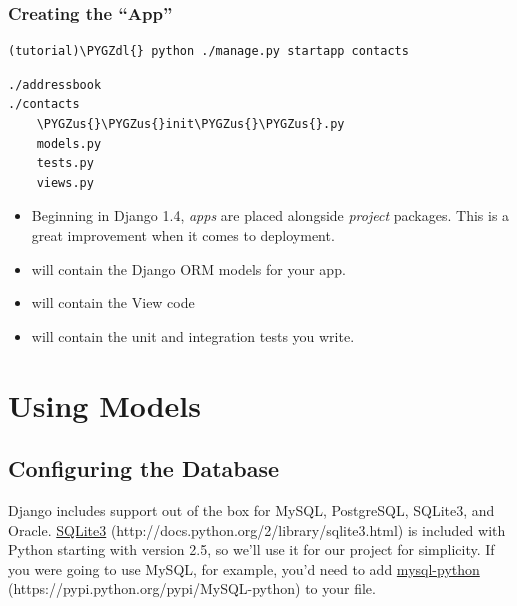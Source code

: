 \documentclass[letterpaper,10pt,english]{sphinxmanual}
\def\PYGZus{\char`\_}
\def\PYGZdl{\char`\$}
\begin{document}
\subsection{Creating the ``App''}
\label{tutorial/getting-started:creating-the-app}\label{tutorial/getting-started:wsgi}
\begin{Verbatim}[commandchars=\\\{\}]
(tutorial)\PYGZdl{} python ./manage.py startapp contacts
\end{Verbatim}

\begin{Verbatim}[commandchars=\\\{\}]
./addressbook
./contacts
    \PYGZus{}\PYGZus{}init\PYGZus{}\PYGZus{}.py
    models.py
    tests.py
    views.py
\end{Verbatim}
\begin{itemize}
\item {} 
Beginning in Django 1.4, \emph{apps} are placed alongside \emph{project}
packages. This is a great improvement when it comes to
deployment.

\item {} 
 will contain the Django ORM models for your app.

\item {} 
 will contain the View code

\item {} 
 will contain the unit and integration tests you
write.

\end{itemize}

\chapter{Using Models}
\label{tutorial/models::doc}\label{tutorial/models:using-models}

\section{Configuring the Database}
\label{tutorial/models:configuring-the-database}
Django includes support out of the box for MySQL, PostgreSQL, SQLite3,
and Oracle. \href{http://docs.python.org/2/library/sqlite3.html}{SQLite3} (http://docs.python.org/2/library/sqlite3.html) is included with Python starting with version
2.5, so we'll use it for our project for simplicity. If you were going
to use MySQL, for example, you'd need to add \href{https://pypi.python.org/pypi/MySQL-python}{mysql-python} (https://pypi.python.org/pypi/MySQL-python) to your
 file.
\end{document}
